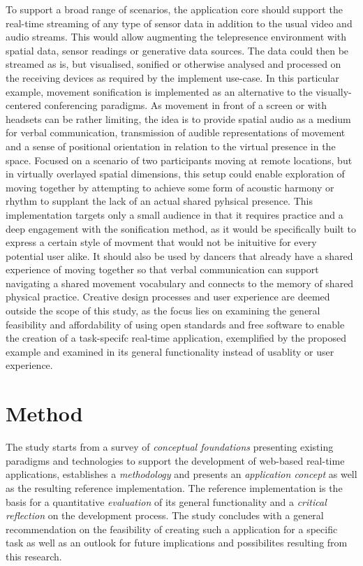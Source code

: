 To support a broad range of scenarios, the application core should support the real-time streaming of any type of sensor data in addition to the usual video and audio streams.
This would allow augmenting the telepresence environment with spatial data, sensor readings or generative data sources.
The data could then be streamed as is, but visualised, sonified or otherwise analysed and processed on the receiving devices as required by the implement use-case.
In this particular example, movement sonification is implemented as an alternative to the visually-centered conferencing paradigms.
As movement in front of a screen or with headsets can be rather limiting, the idea is to provide spatial audio as a medium for verbal communication, transmission of audible representations of movement and a sense of positional orientation in relation to the virtual presence in the space.
Focused on a scenario of two participants moving at remote locations, but in virtually overlayed spatial dimensions, this setup could enable exploration of moving together by attempting to achieve some form of acoustic harmony or rhythm to supplant the lack of an actual shared pyhsical presence.
This implementation targets only a small audience in that it requires practice and a deep engagement with the sonification method, as it would be specifically built to express a certain style of movment that would not be inituitive for every potential user alike.
It should also be used by dancers that already have a shared experience of moving together so that verbal communication can support navigating a shared movement vocabulary and connects to the memory of shared physical practice.
Creative design processes and user experience are deemed outside the scope of this study, as the focus lies on examining the general feasibility and affordability of using open standards and free software to enable the creation of a task-specifc real-time application, exemplified by the proposed example and examined in its general functionality instead of usablity or user experience.

\section{Method}

The study starts from a survey of \emph{conceptual foundations} presenting existing paradigms and technologies to support the development of web-based real-time applications, establishes a \emph{methodology} and presents an \emph{application concept} as well as the resulting {reference implementation}.
The reference implementation is the basis for a quantitative \emph{evaluation} of its general functionality and a \emph{critical reflection} on the development process.
The study concludes with a general recommendation on the feasibility of creating such a  application for a specific task as well as an outlook for future implications and possibilites resulting from this research.
